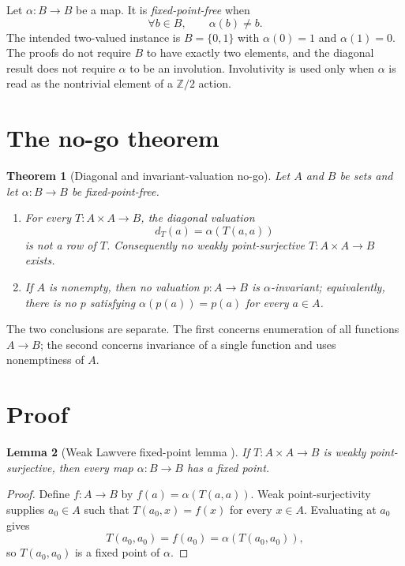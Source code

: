 \documentclass[11pt]{article}
\newtheorem{theorem}{Theorem}[section]
\newtheorem{lemma}[theorem]{Lemma}
\theoremstyle{definition}
\theoremstyle{remark}
\begin{document}
Let $\alpha\colon B\to B$ be a map. It is \emph{fixed-point-free} when
\[
\forall b\in B,\qquad \alpha(b)\neq b.
\]
The intended two-valued instance is $B=\{0,1\}$ with $\alpha(0)=1$ and $\alpha(1)=0$. The proofs do not require $B$ to have exactly two elements, and the diagonal result does not require $\alpha$ to be an involution. Involutivity is used only when $\alpha$ is read as the nontrivial element of a $\mathbb{Z}/2$ action.

\section{The no-go theorem}
\label{sec:theorem}

\begin{theorem}[Diagonal and invariant-valuation no-go]
\label{thm:main}
Let $A$ and $B$ be sets and let $\alpha\colon B\to B$ be fixed-point-free.
\begin{enumerate}
\item For every $T\colon A\times A\to B$, the diagonal valuation
\[
d_T(a)=\alpha(T(a,a))
\]
is not a row of $T$. Consequently no weakly point-surjective $T\colon A\times A\to B$ exists.
\item If $A$ is nonempty, then no valuation $p\colon A\to B$ is $\alpha$-invariant; equivalently, there is no $p$ satisfying $\alpha(p(a))=p(a)$ for every $a\in A$.
\end{enumerate}
\end{theorem}

The two conclusions are separate. The first concerns enumeration of all functions $A\to B$; the second concerns invariance of a single function and uses nonemptiness of $A$.

\section{Proof}
\label{sec:proof}

\begin{lemma}[Weak Lawvere fixed-point lemma \cite{lawvere1969,yanofsky2003}]
\label{lem:lawvere}
If $T\colon A\times A\to B$ is weakly point-surjective, then every map $\alpha\colon B\to B$ has a fixed point.
\end{lemma}

\begin{proof}
Define $f\colon A\to B$ by $f(a)=\alpha(T(a,a))$. Weak point-surjectivity supplies $a_0\in A$ such that $T(a_0,x)=f(x)$ for every $x\in A$. Evaluating at $a_0$ gives
\[
T(a_0,a_0)=f(a_0)=\alpha(T(a_0,a_0)),
\]
so $T(a_0,a_0)$ is a fixed point of $\alpha$.
\end{proof}
\end{document}
